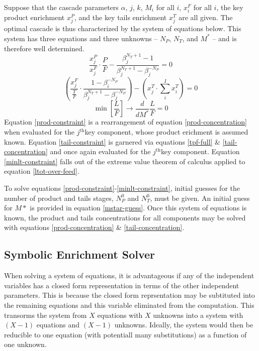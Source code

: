 \documentclass[preprint,12pt]{elsarticle}
\newcommand{\superscript}[1]{\ensuremath{^{\textrm{#1}}}}
\newcommand{\jth}[0]{$j$\superscript{th}}
\begin{document}
Suppose that the cascade parameters 
$\alpha$, 
$j$, $k$, 
$M_i$ for all $i$, 
$x_i^F$ for all $i$, 
the key product enrichment $x_j^P$, and the key 
tails enrichment $x_j^T$ are all given.  The optimal cascade is thus characterized by 
the system of equations below. This system has three equations and three unknowns --
$N_P$, $N_T$, and $M^*$ -- and is therefore well determined.
\begin{equation}
\frac{x_j^P}{x_j^F}\cdot\frac{P}{F} - \frac{\beta_j^{N_T+1} - 1}
                                           {\beta_j^{N_T+1} - \beta_j^{-N_P}} = 0
\label{prod-constraint}
\end{equation}
\begin{equation}
\left(\frac{x_j^F}{\frac{T}{F}} \cdot \frac{1 - \beta_i^{-N_P}}
                                           {\beta_j^{N_T+1} - \beta_j^{-N_P}} \right)
- \left(x_j^T\cdot\sum_i^{I} x_i^T\right) = 0
\label{tail-constraint}
\end{equation}
\begin{equation}
\min\left[\frac{L}{F}\right]\to \frac{d}{dM^*} \frac{L}{F} = 0
\label{minlt-constraint}
\end{equation}
Equation \ref{prod-constraint} is a rearrangement of equation \ref{prod-concentration}
when evaluated for the \jth key component, whose product erichment is assumed
known.  Equation \ref{tail-constraint} is garnered via equations \ref{tpf-full} \&
\ref{tail-concentration} and once again evaluated for the \jth key component.
Equation \ref{minlt-constraint} falls out of the extreme value theorem of calculus
applied to equation \ref{ltot-over-feed}.

To solve equations \ref{prod-constraint}-\ref{minlt-constraint}, initial guesses
for the number of product and tails stages, $N_P^0$ and $N_T^0$, must be given.
An initial guess for $M*$ is provided in equation \ref{mstar-guess}.  Once this system
of equations is known, the product and tails concentrations for all components may be 
solved with equations \ref{prod-concentration} \& \ref{tail-concentration}.

\subsection{Symbolic Enrichment Solver}
\label{sec:symes}

When solving a system of equations, it is advantageous if any of the independent 
variables has a closed form representation in terms of the other independent 
parameters. This is because the closed form reprsentation may be subtituted into 
the remaining equations and this variable eliminated from the computation.  This
transorms the system from $X$ equations with $X$ unknowns into a system with 
$(X-1)$ equations and $(X-1)$  unknowns.  Ideally, the system would then be reducible 
to one equation (with potentiall many substitutions) as a function of one unknown.
\end{document}
